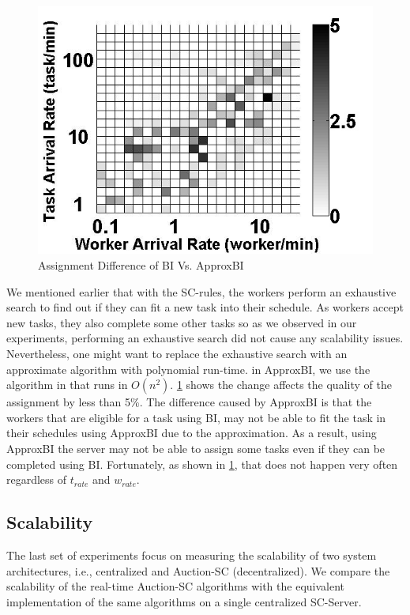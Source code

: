 \begin{figure}[h]
	\centering
	\includegraphics[scale=0.25]{figures/bi_abi.jpg}
	\caption{Assignment Difference of BI Vs. ApproxBI}\label{fig:bi_abi}
\end{figure}

We mentioned earlier that with the SC-rules, the workers perform an exhaustive search to find out if they can fit a new task into their schedule. As workers accept new tasks, they also complete some other tasks so as we observed in our experiments, performing an exhaustive search did not cause any scalability issues. Nevertheless, one might want to replace the exhaustive search with an approximate algorithm with polynomial run-time. in ApproxBI, we use the algorithm in \cite{Rosenkrantz74} that runs in $O(n^2)$. \cref{fig:bi_abi} shows the change affects the quality of the assignment by less than 5\%. The difference caused by ApproxBI is that the workers that are eligible for a task using BI, may not be able to fit the task in their schedules using ApproxBI due to the approximation. As a result, using ApproxBI the server may not be able to assign some tasks even if they can be completed using BI. Fortunately, as shown in \cref{fig:bi_abi}, that does not happen very often regardless of $t_{rate}$ and $w_{rate}$.

\subsection{Scalability}
The last set of experiments focus on measuring the scalability of two system architectures, i.e., centralized and Auction-SC (decentralized). We compare the scalability of the real-time Auction-SC algorithms with the equivalent implementation of the same algorithms on a single centralized SC-Server. 


